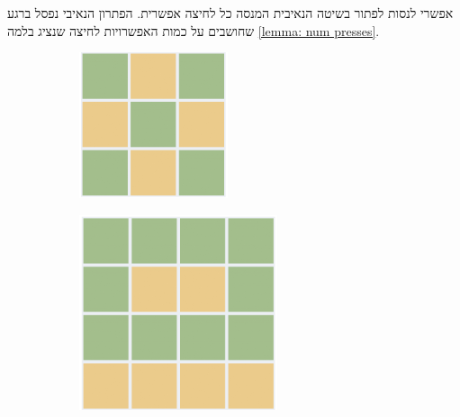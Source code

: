\documentclass[12pt,twoside]{article}
\begin{document}
 אפשרי לנסות
לפתור בשיטה הנאיבית המנסה כל לחיצה אפשרית.
הפתרון הנאיבי נפסל ברגע שחושבים על כמות האפשרויות לחיצה
שנציג בלמה 
\ref{lemma: num presses}.

\begin{figure}[ht]
    \caption{פתרונות של משחק על לוחות שונים}
    \label{fig:sol_3_4_5}
    \centering
    \begin{subfigure}[b]{.25\linewidth}
    \includegraphics[width=\linewidth]{images/3x3_sol.PNG}
    \end{subfigure}
    \begin{subfigure}[b]{.25\linewidth}
    \includegraphics[width=\linewidth]{images/4x4_sol.PNG}

\end{subfigure}
\end{figure}
\end{document}
